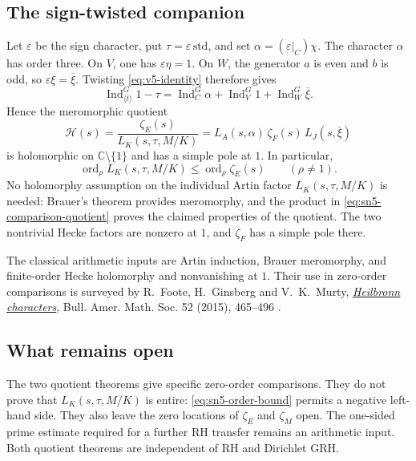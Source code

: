 \subsection{The sign-twisted companion}

Let $\varepsilon$ be the sign character, put
$\tau=\varepsilon\,\mathrm{std}$, and set
$\alpha=(\varepsilon|_C)\chi$. The character $\alpha$ has order three.
On $V$, one has $\varepsilon\eta=1$. On $W$, the generator $a$ is even
and $b$ is odd, so $\varepsilon\xi=\overline\xi$.
Twisting \eqref{eq:v5-identity} therefore gives
\[
 \operatorname{Ind}_{\langle t\rangle}^{G}1-\tau
 =\operatorname{Ind}_{C}^{G}\alpha
   +\operatorname{Ind}_{V}^{G}1
   +\operatorname{Ind}_{W}^{G}\overline\xi.
\]
Hence the meromorphic quotient
\begin{equation}
 \mathcal H(s)=\frac{\zeta_E(s)}{L_K(s,\tau,M/K)}
 =L_A(s,\alpha)\,\zeta_F(s)\,L_J(s,\overline\xi)
\label{eq:sn5-comparison-quotient}
\end{equation}
is holomorphic on $\mathbb C\setminus\{1\}$ and has a simple pole
at $1$. In particular,
\begin{equation}
 \operatorname{ord}_{\rho}L_K(s,\tau,M/K)
 \leq \operatorname{ord}_{\rho}\zeta_E(s)
 \qquad(\rho\ne1).
\label{eq:sn5-order-bound}
\end{equation}
No holomorphy assumption on the individual Artin factor
$L_K(s,\tau,M/K)$ is needed: Brauer's theorem provides meromorphy,
and the product in \eqref{eq:sn5-comparison-quotient} proves the claimed
properties of the quotient. The two nontrivial Hecke factors are
nonzero at $1$, and $\zeta_F$ has a simple pole there.

The classical arithmetic inputs are Artin induction, Brauer meromorphy,
and finite-order Hecke holomorphy and nonvanishing at $1$. Their use in
zero-order comparisons is surveyed by R.~Foote, H.~Ginsberg and
V.~K.~Murty, \href{https://doi.org/10.1090/BULL/1492}{\emph{Heilbronn
characters}}, Bull. Amer. Math. Soc. 52 (2015), 465--496 \cite{heilbronn}.

\subsection{What remains open}

The two quotient theorems give specific zero-order comparisons.
They do not prove that $L_K(s,\tau,M/K)$ is entire:
\eqref{eq:sn5-order-bound} permits a negative left-hand side.
They also leave the zero locations of $\zeta_E$ and $\zeta_M$ open.
The one-sided prime estimate required for a further RH transfer remains
an arithmetic input. Both quotient theorems are independent of RH and
Dirichlet GRH.

